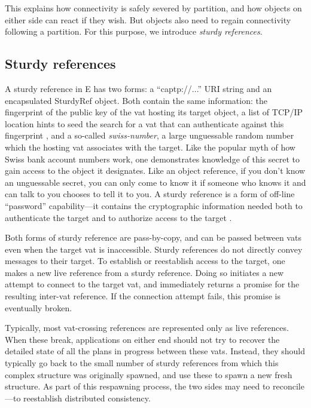 \documentclass{llncs}
\begin{document}
This explains how connectivity is safely severed by partition, and how
objects on either side can react if they wish. But objects also need
to regain connectivity following a partition. For this purpose, we
introduce \emph{sturdy references}.

\subsection{Sturdy references}

A sturdy reference in E has two forms: a ``captp://...'' URI string
and an encapsulated SturdyRef object. Both contain the same
information: the fingerprint of the public key of the vat hosting its
target object, a list of TCP/IP location hints to seed the search for
a vat that can authenticate against this fingerprint \cite{tyler:yurl},
and a so-called \emph{swiss-number}, a large unguessable random number
which the hosting vat associates with the target. Like the popular
myth of how Swiss bank account numbers work, one demonstrates
knowledge of this secret to gain access to the object it designates.
Like an object reference, if you don't know an unguessable secret, you
can only come to know it if someone who knows it and can talk to you
chooses to tell it to you. A sturdy reference is a form of off-line
``password'' capability---it contains the cryptographic information
needed both to authenticate the target and to authorize access to the
target \cite{jed:dccs}.

Both forms of sturdy reference are pass-by-copy, and can be passed
between vats even when the target vat is inaccessible. Sturdy
references do not directly convey messages to their target. To
establish or reestablish access to the target, one makes a new live
reference from a sturdy reference. Doing so initiates a new attempt to
connect to the target vat, and immediately returns a promise for the
resulting inter-vat reference. If the connection attempt fails, this
promise is eventually broken.

Typically, most vat-crossing references are represented only as live
references. When these break, applications on either end should not
try to recover the detailed state of all the plans in progress between
these vats. Instead, they should typically go back to the small number
of sturdy references from which this complex structure was originally
spawned, and use these to spawn a new fresh structure. As part of this
respawning process, the two sides may need to reconcile---to
reestablish distributed consistency.
\end{document}
